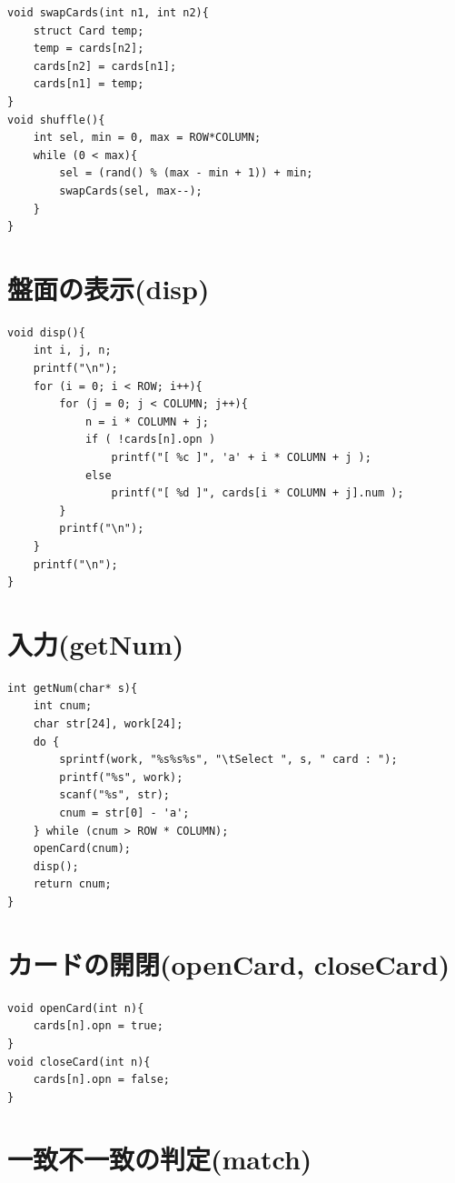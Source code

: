 \documentclass[uplatex,a4paper,11pt,oneside,openany]{jsbook}
\begin{document}
\begin{lstlisting}
void swapCards(int n1, int n2){
    struct Card temp;
    temp = cards[n2];
    cards[n2] = cards[n1];
    cards[n1] = temp;
}
void shuffle(){
    int sel, min = 0, max = ROW*COLUMN;
    while (0 < max){
        sel = (rand() % (max - min + 1)) + min;
        swapCards(sel, max--);
    }
}
\end{lstlisting}

\section{盤面の表示(disp)}

\begin{lstlisting}
void disp(){
    int i, j, n;
    printf("\n");
    for (i = 0; i < ROW; i++){
        for (j = 0; j < COLUMN; j++){
            n = i * COLUMN + j;
            if ( !cards[n].opn )
                printf("[ %c ]", 'a' + i * COLUMN + j );
            else
                printf("[ %d ]", cards[i * COLUMN + j].num );
        }
        printf("\n");
    }
    printf("\n");
}
\end{lstlisting}

\section{入力(getNum)}

\begin{lstlisting}
int getNum(char* s){
    int cnum;
    char str[24], work[24];
    do {
        sprintf(work, "%s%s%s", "\tSelect ", s, " card : ");
        printf("%s", work);
        scanf("%s", str);
        cnum = str[0] - 'a';
    } while (cnum > ROW * COLUMN);
    openCard(cnum);
    disp();
    return cnum;
}
\end{lstlisting}

\section{カードの開閉(openCard, closeCard)}

\begin{lstlisting}
void openCard(int n){
    cards[n].opn = true;
}
void closeCard(int n){
    cards[n].opn = false;
}
\end{lstlisting}

\section{一致不一致の判定(match)}
\end{document}
